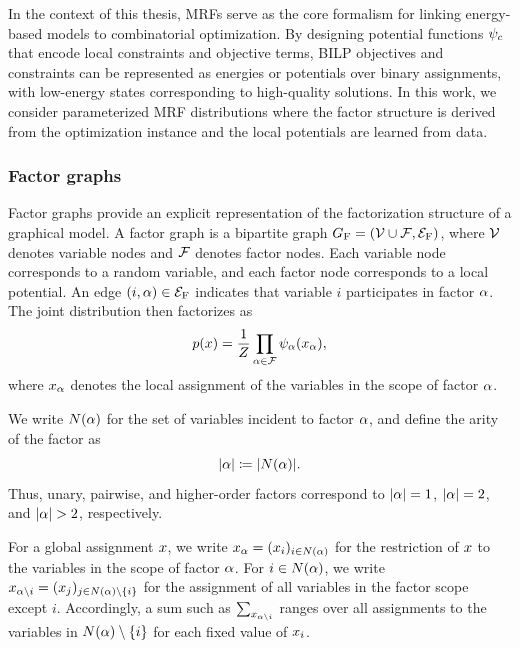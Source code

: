 In the context of this thesis, MRFs serve as the core formalism for linking energy-based models to combinatorial optimization. By designing potential functions $\psi_c$ that encode local constraints and objective terms, BILP objectives and constraints can be represented as energies or potentials over binary assignments, with low-energy states corresponding to high-quality solutions. In this work, we consider parameterized MRF distributions where the factor structure is derived from the optimization instance and the local potentials are learned from data.

\subsubsection{Factor graphs}

Factor graphs provide an explicit representation of the factorization structure of a graphical model. A factor graph is a bipartite graph 
$G_{\mathrm{F}}=(\mathcal{V}\cup\mathcal{F},\mathcal{E}_{\mathrm{F}})$, where $\mathcal{V}$ denotes variable nodes and $\mathcal{F}$ denotes factor nodes. Each variable node corresponds to a random variable, and each factor node corresponds to a local potential. An edge $(i,\alpha)\in \mathcal{E}_{\mathrm{F}}$ indicates that variable $i$ participates in factor $\alpha$. The joint distribution then factorizes as
\begin{equation}
p(x) = \frac{1}{Z}\prod_{\alpha\in \mathcal{F}}\psi_{\alpha}(x_{\alpha}),
\end{equation}
where $x_{\alpha}$ denotes the local assignment of the variables in the scope of factor $\alpha$.

We write $N(\alpha)$ for the set of variables incident to factor $\alpha$, and define the arity of the factor as
\begin{equation*}
|\alpha| \coloneqq |N(\alpha)|.
\end{equation*}
Thus, unary, pairwise, and higher-order factors correspond to $|\alpha|=1$, $|\alpha|=2$, and $|\FACTOR|>2$, respectively. 

For a global assignment $x$, we write $x_{\alpha} = (x_i)_{i\in N(\alpha)}$ for the restriction of $x$ to the variables in the scope of factor $\alpha$. For $i\in N(\alpha)$, we write $x_{\alpha\setminus i} = (x_j)_{j\in N(\alpha)\setminus\{i\}}$ for the assignment of all variables in the factor scope except $i$. Accordingly, a sum such as $\sum_{x_{\alpha\setminus i}}$ ranges over all assignments to the variables in $N(\alpha)\setminus\{i\}$ for each fixed value of $x_i$.

